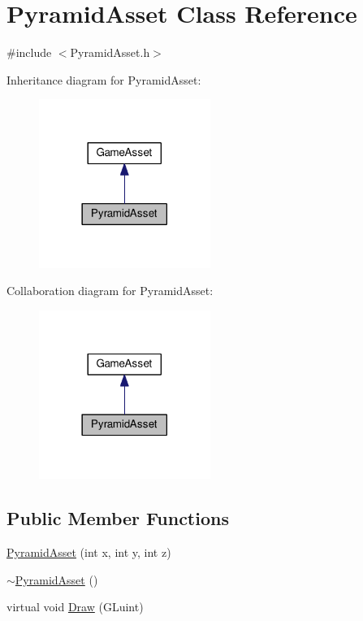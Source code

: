 \hypertarget{class_pyramid_asset}{}\section{Pyramid\+Asset Class Reference}
\label{class_pyramid_asset}


{\ttfamily \#include $<$Pyramid\+Asset.\+h$>$}



Inheritance diagram for Pyramid\+Asset\+:
\nopagebreak
\begin{figure}[H]
\begin{center}
\leavevmode
\includegraphics[width=158pt]{class_pyramid_asset__inherit__graph}
\end{center}
\end{figure}


Collaboration diagram for Pyramid\+Asset\+:
\nopagebreak
\begin{figure}[H]
\begin{center}
\leavevmode
\includegraphics[width=158pt]{class_pyramid_asset__coll__graph}
\end{center}
\end{figure}
\subsection*{Public Member Functions}
\begin{DoxyCompactItemize}
\item 
\hyperlink{class_pyramid_asset_a9416c9f36aebef2bf217fc8f3bdf08ce}{Pyramid\+Asset} (int x, int y, int z)
\item 
\hyperlink{class_pyramid_asset_afb388a196f43a3808b2d4f6fdb89ee84}{$\sim$\+Pyramid\+Asset} ()
\item 
virtual void \hyperlink{class_pyramid_asset_aaea45da4956d79ec9ab96e9d0ccef3fe}{Draw} (G\+Luint)
\end{DoxyCompactItemize}
